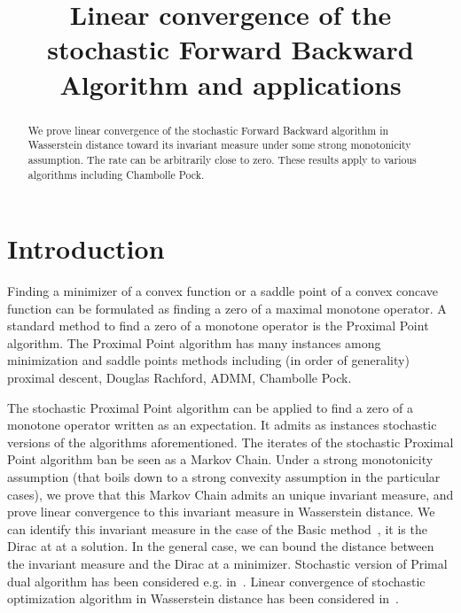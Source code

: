 \documentclass{article}
\title{Linear convergence of the stochastic Forward Backward Algorithm and applications}
\newcommand{\1}{\mathbbm 1}
\theoremstyle{definition}
\begin{document}
%
\maketitle
%



\begin{abstract} 
We prove linear convergence of the stochastic Forward Backward algorithm in Wasserstein distance toward its invariant measure under some strong monotonicity assumption. The rate can be arbitrarily close to zero. These results apply to various algorithms including Chambolle Pock.
\end{abstract}

%
%

\section{Introduction}
Finding a minimizer of a convex function or a saddle point of a convex concave function can be formulated as finding a zero of a maximal monotone operator. A standard method to find a zero of a monotone operator is the Proximal Point algorithm. The Proximal Point algorithm has many instances among minimization and saddle points methods including (in order of generality) proximal descent, Douglas Rachford, ADMM, Chambolle Pock.

The stochastic Proximal Point algorithm can be applied to find a zero of a monotone operator written as an expectation. It admits as instances stochastic versions of the algorithms aforementioned. The iterates of the stochastic Proximal Point algorithm ban be seen as a Markov Chain. Under a strong monotonicity assumption (that boils down to a strong convexity assumption in the particular cases), we prove that this Markov Chain admits an unique invariant measure, and prove linear convergence to this invariant measure in Wasserstein distance. We can identify this invariant measure in the case of the Basic method~\cite{richtarik2017stochastic}, it is the Dirac at at a solution. In the general case, we can bound the distance between the invariant measure and the Dirac at a minimizer. 
Stochastic version of Primal dual algorithm has been considered e.g. in~\cite{chambolle2018stochastic}. Linear convergence of stochastic optimization algorithm in Wasserstein distance has been considered in~\cite{dieuleveut2017bridging,can2019accelerated}. 
\end{document}
